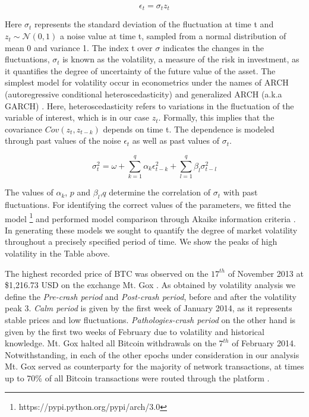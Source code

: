 \begin{equation}
\epsilon_t = \sigma_t z_t
\end{equation}

Here $\sigma_t$ represents the standard deviation of the fluctuation at time t and $z_t \sim \mathcal{N}(0,1)$ a noise value at time t, sampled from a normal distribution of mean 0 and variance 1. The index t over $\sigma$ indicates the changes in the fluctuations, $\sigma_t$ is known as the volatility, a measure of the risk in investment, as it quantifies the degree of uncertainty of the future value of the asset. The simplest model for volatility occur in econometrics under the names of ARCH (autoregressive conditional heteroscedasticity) and generalized ARCH (a.k.a GARCH) \cite{GARCH}. Here, heteroscedasticity refers to variations in the fluctuation of the variable of interest, which is in our case $z_t$. Formally, this implies that the covariance $Cov(z_t , z_{t-k})$ depends on time t. The dependence is modeled through past values of the noise $\epsilon_t$ as well as past values of $\sigma_t$.

\begin{equation}
 \sigma^2_t   =  \omega + \sum^{q}_{k=1}\alpha_{k} \epsilon_{t-k}^2 + \sum^{q}_{l=1}\beta_{l} \sigma_{t-l}^2 
\end{equation}

The values of $\alpha_k$, $p$ and $\beta_l$,$q$ determine the correlation of $\sigma_t$ with past fluctuations. For identifying the correct values of the parameters, we fitted the model \footnote{https://pypi.python.org/pypi/arch/3.0} and performed model comparison through Akaike information criteria \cite{Information}.
In generating these models we sought to quantify the degree of market volatility throughout a precisely specified period of time. We show the peaks of high volatility in the Table above.

The highest recorded price of BTC was observed on the $17^{th}$ of November 2013 at \$1,216.73 USD on the exchange Mt. Gox \cite{crash}.
As obtained by volatility analysis we define the \textit{Pre-crash period} and \textit{Post-crash period}, before and after the volatility peak 3.  \textit{Calm period} is given by the first week of January 2014, as it represents stable prices and low fluctuations.
\textit{Pathologies-crash period} on the other hand is given by the first two weeks of February due to volatility and historical knowledge. Mt. Gox halted all Bitcoin withdrawals on the $7^{th}$ of February 2014. Notwithstanding, in each of the other epochs under consideration in our analysis Mt. Gox served as counterparty for the majority of network transactions, at times up to 70\% of all Bitcoin transactions were routed through the platform \cite{wsj}. 


